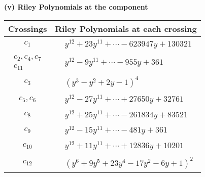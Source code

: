 \documentclass[1p]{elsarticle_modified}
\theoremstyle{definition}
\begin{document}
\newpage\renewcommand{\arraystretch}{1}
\flushleft \textbf{(v) Riley Polynomials at the component}\newline \\
\begin{tabular}{m{50pt}|m{274pt}}
Crossings & \hspace{64pt}Riley Polynomials at each crossing \\
\hline $$\begin{aligned}c_{1}\end{aligned}$$&$\begin{aligned}
&y^{12}+23 y^{11}+\cdots-623947 y+130321
\end{aligned}$\\
\hline $$\begin{aligned}c_{2},c_{4},c_{7}\\c_{11}\end{aligned}$$&$\begin{aligned}
&y^{12}-9 y^{11}+\cdots-955 y+361
\end{aligned}$\\
\hline $$\begin{aligned}c_{3}\end{aligned}$$&$\begin{aligned}
&(y^3- y^2+2 y-1)^4
\end{aligned}$\\
\hline $$\begin{aligned}c_{5},c_{6}\end{aligned}$$&$\begin{aligned}
&y^{12}-27 y^{11}+\cdots+27650 y+32761
\end{aligned}$\\
\hline $$\begin{aligned}c_{8}\end{aligned}$$&$\begin{aligned}
&y^{12}+25 y^{11}+\cdots-261834 y+83521
\end{aligned}$\\
\hline $$\begin{aligned}c_{9}\end{aligned}$$&$\begin{aligned}
&y^{12}-15 y^{11}+\cdots-481 y+361
\end{aligned}$\\
\hline $$\begin{aligned}c_{10}\end{aligned}$$&$\begin{aligned}
&y^{12}+11 y^{11}+\cdots+12836 y+10201
\end{aligned}$\\
\hline $$\begin{aligned}c_{12}\end{aligned}$$&$\begin{aligned}
&(y^6+9 y^5+23 y^4-17 y^2-6 y+1)^2
\end{aligned}$\\
\hline
\end{tabular}\\~\\
\end{document}
